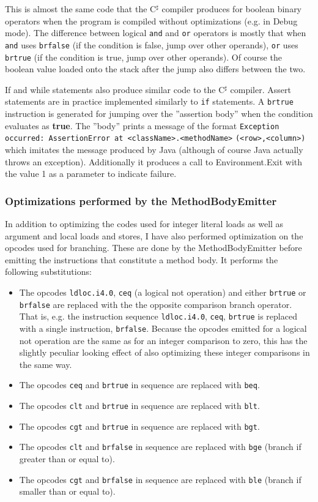 \documentclass[a4paper,11pt]{article}
\begin{document}
This is almost the same code that the C$^\sharp$ compiler produces for boolean binary operators when the program is compiled without optimizations (e.g. in Debug mode). The difference between logical \verb,and, and \verb,or, operators is mostly that when \verb,and, uses \verb,brfalse, (if the condition is false, jump over other operands), \verb,or, uses \verb,brtrue, (if the condition is true, jump over other operands). Of course the boolean value loaded onto the stack after the jump also differs between the two.

If and while statements also produce similar code to the C$^\sharp$ compiler. Assert statements are in practice implemented similarly to \verb,if, statements. A \verb,brtrue, instruction is generated for jumping over the ''assertion body'' when the condition evaluates as \textbf{true}. The ''body'' prints a message of the format \verb|Exception occurred: AssertionError at <className>.<methodName>| \verb|(<row>,<column>)| which imitates the message produced by Java (although of course Java actually throws an exception). Additionally it produces a call to Environment.Exit with the value 1 as a parameter to indicate failure.

\subsubsection{Optimizations performed by the MethodBodyEmitter}

In addition to optimizing the codes used for integer literal loads as well as argument and local loads and stores, I have also performed optimization on the opcodes used for branching. These are done by the MethodBodyEmitter before emitting the instructions that constitute a method body. It performs the following substitutions:
\begin{itemize}
    \item The opcodes \verb,ldloc.i4.0,, \verb,ceq, (a logical not operation) and either \verb,brtrue, or \verb,brfalse, are replaced with the the opposite comparison branch operator. That is, e.g. the instruction sequence \verb,ldloc.i4.0,, \verb,ceq,, \verb,brtrue, is replaced with a single instruction, \verb,brfalse,. Because the opcodes emitted for a logical not operation are the same as for an integer comparison to zero, this has the slightly peculiar looking effect of also optimizing these integer comparisons in the same way.
    \item The opcodes \verb,ceq, and \verb,brtrue, in sequence are replaced with \verb,beq,.
    \item The opcodes \verb,clt, and \verb,brtrue, in sequence are replaced with \verb,blt,.
    \item The opcodes \verb,cgt, and \verb,brtrue, in sequence are replaced with \verb,bgt,.
    \item The opcodes \verb,clt, and \verb,brfalse, in sequence are replaced with \verb,bge, (branch if greater than or equal to).
    \item The opcodes \verb,cgt, and \verb,brfalse, in sequence are replaced with \verb,ble, (branch if smaller than or equal to).
\end{itemize}
\end{document}
